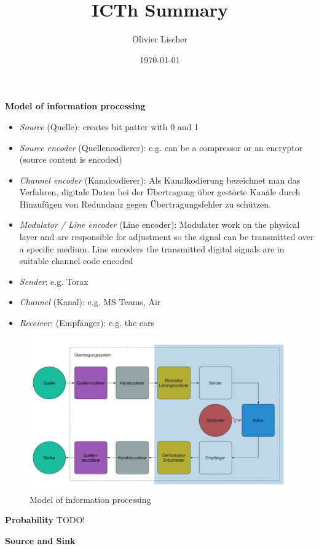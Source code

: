 \documentclass[11pt,twoside,twocolumn,landscape]{article}
\author{Olivier Lischer}
\date{\today}
\title{ICTh Summary}
\begin{document}
\pagestyle{fancy}
\fancyhf{}
\fancyfoot[CE,CO]{\leftmark}
\fancyfoot[R]{\thepage}

\textbf{Model of information processing}

\begin{itemize}
\item \emph{Source} (Quelle): creates bit patter with 0 and 1
\item \emph{Source encoder} (Quellencodierer): e.g. can be a compressor or an encryptor (source content is encoded)
\item \emph{Channel encoder} (Kanalcodierer): 
Als Kanalkodierung bezeichnet man das Verfahren, digitale Daten bei der Übertragung über gestörte Kanäle durch Hinzufügen von Redundanz gegen Übertragungsfehler zu schützen.
\item \emph{Modulator / Line encoder} (Line encoder): Modulater work on the physical layer and are responsible for adjustment so the signal can be transmitted over a specific medium. Line encoders the transmitted digital signals are in suitable channel code encoded
\item \emph{Sender}: e.g. Torax
\item \emph{Channel} (Kanal): e.g. MS Teams, Air
\item \emph{Receiver}: (Empfänger): e.g. the ears
\end{itemize}

\begin{figure}[htbp]
\centering
\includegraphics[width=.9\linewidth]{img/modell_der_informationsverarbeitung.png}
\caption{\label{fig:orgd673fa2}Model of information processing}
\end{figure}

\textbf{Probability}
TODO!

\textbf{Source and Sink}
\end{document}
